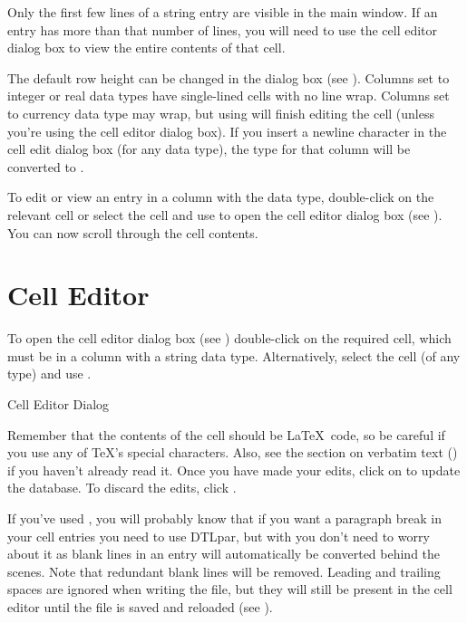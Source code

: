 \begin{information}
Only the first few lines of a string entry are visible in the main 
window. If an entry has more than that number of lines, you will need to 
use the cell editor dialog box to view the entire contents of that 
cell.
\end{information}

The default row height can be changed in the
 dialog box (see ).
Columns set to integer or real data types have single-lined cells with no
line wrap. Columns set to currency data type may wrap, but using 
 will finish editing the cell (unless you're using the cell
editor dialog box). If you insert a newline character in the cell
edit dialog box (for any data type), the type for that column will 
be converted to .

To edit or view an entry in a column
with the  data type, double-click on the relevant cell or 
select the cell and use  to open the cell editor 
dialog box (see ). You can now scroll through
the cell contents.

\section{Cell Editor}\label{sec:celleditor}

To open the cell editor dialog box (see )
double-click on the required cell, which must be in a column with a 
string data type. Alternatively, select the cell (of any type) and use 
.

 {%
 }
 {Cell Editor Dialog}

Remember that the contents of the cell should be \LaTeX\ code, so be
careful if you use any of \TeX's special characters. Also, see the
section on verbatim text () if you haven't 
already read it.
Once you have made your edits, click on 
to update the database. To discard the edits, click 
.

If you've used , you will probably know that 
if you want a paragraph break in your cell entries you need to use 
\gls{DTLpar}, but with  you don't need to worry about it 
as blank lines in an entry will automatically be converted behind 
the scenes. Note that redundant blank lines will be removed. Leading
and trailing spaces are ignored when writing the  file,
but they will still be present in the cell editor until the file is
saved and reloaded (see ).

